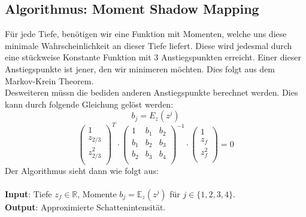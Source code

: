 \documentclass[runningheaders,a4paper]{llncs}
\begin{document}
\subsection{Algorithmus: Moment Shadow Mapping}
Für jede Tiefe, benötigen wir eine Funktion mit Momenten, welche uns diese minimale Wahrscheinlichkeit an dieser Tiefe liefert. Diese wird jedesmal durch eine stückweise Konstante Funktion mit 3 Anstiegspunkten erreicht. Einer dieser Anstiegspunkte ist jener, den wir minimeren möchten. Dies folgt aus dem Markov-Krein Theorem.\cite{msm}\\
Desweiteren müssn die bediden anderen Anstiegspunkte berechnet werden. Dies kann durch folgende Gleichung gelöst werden:
$$b_j = E_z(z^j)$$
$$\begin{pmatrix} 
1\\
z_{2/3}\\
z^2_{2/3}\\
\end{pmatrix}^T \cdot 
\begin{pmatrix}
1 & b_1 & b_2\\
b_1 & b_2 & b_3\\
b_2 & b_3 & b_4\\
\end{pmatrix}^{-1} \cdot
\begin{pmatrix}
1\\
z_f\\
z^2_f\\
\end{pmatrix} = 0
$$
Der Algorithmus sieht dann wie folgt aus:\\
\\
\textbf{Input}: Tiefe $z_f \in \mathbb{R}$, Momente $b_j = \mathbb{E}_z(z^j)$ für $j \in \{1,2,3,4\}$.\\
\textbf{Output}: Approximierte Schattenintensität.\\
\end{document}
